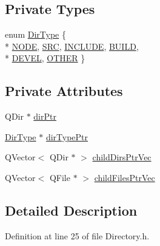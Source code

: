 \subsection*{Private Types}
\begin{DoxyCompactItemize}
\item 
enum \hyperlink{class_directory_a1c40bdd8c03ef51a29fa097c325fe345}{Dir\-Type} \{ \\*
\hyperlink{class_directory_a1c40bdd8c03ef51a29fa097c325fe345a032f30deac97c5bda25698f881b31b16}{N\-O\-D\-E}, 
\hyperlink{class_directory_a1c40bdd8c03ef51a29fa097c325fe345a04113739df8828cf617628d4409d246b}{S\-R\-C}, 
\hyperlink{class_directory_a1c40bdd8c03ef51a29fa097c325fe345a398cbd150a21421197b733b2a71620b4}{I\-N\-C\-L\-U\-D\-E}, 
\hyperlink{class_directory_a1c40bdd8c03ef51a29fa097c325fe345a5eadd6da197b9497d88d759f877d1a6e}{B\-U\-I\-L\-D}, 
\\*
\hyperlink{class_directory_a1c40bdd8c03ef51a29fa097c325fe345ae99347ac7c31d8d87215e88a3805d136}{D\-E\-V\-E\-L}, 
\hyperlink{class_directory_a1c40bdd8c03ef51a29fa097c325fe345af0bbf2abf7d54499e138b6a3448f05f8}{O\-T\-H\-E\-R}
 \}
\end{DoxyCompactItemize}
\subsection*{Private Attributes}
\begin{DoxyCompactItemize}
\item 
Q\-Dir $\ast$ \hyperlink{class_directory_ae8d40a5989c8fe90988aa9517cb87a9a}{dir\-Ptr}
\item 
\hyperlink{class_directory_a1c40bdd8c03ef51a29fa097c325fe345}{Dir\-Type} $\ast$ \hyperlink{class_directory_aeb912c1ed24b2bea1febce142fa3a57e}{dir\-Type\-Ptr}
\item 
Q\-Vector$<$ Q\-Dir $\ast$ $>$ \hyperlink{class_directory_a46f528b377bd9738da7c5a4ff9bb643e}{child\-Dirs\-Ptr\-Vec}
\item 
Q\-Vector$<$ Q\-File $\ast$ $>$ \hyperlink{class_directory_a3dcbd1171a1c28867b8c718bb0ecf5ff}{child\-Files\-Ptr\-Vec}
\end{DoxyCompactItemize}


\subsection{Detailed Description}


Definition at line 25 of file Directory.\-h.



